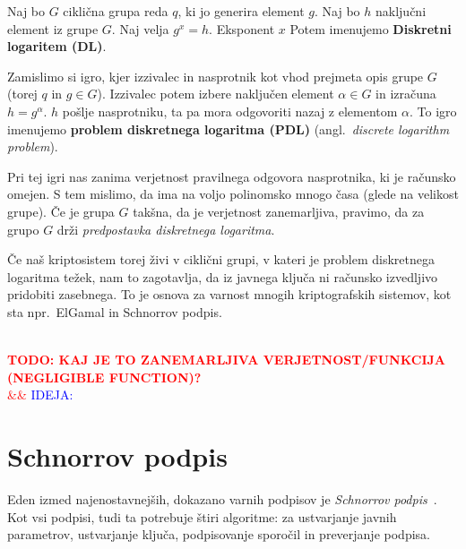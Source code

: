 \documentclass[isrm2, tisk]{fmfdelo}
\newcommand{\todo}[2][]{%
    \textcolor{red}{%
        \\ \textbf{\uppercase{todo: #2}}%
        \\%
        \ifx&#1&%
        \else%
            \textcolor{blue}{\uppercase{ideja:} #1}%
            \\%
        \fi%
    }%
}
\begin{document}
\begin{definicija}
\label{def:dl}
    Naj bo $G$ ciklična grupa reda $q$, ki jo generira element $g$. Naj bo $h$ naključni element iz 
    grupe $G$. Naj velja $g^x = h$. Eksponent $x$ Potem imenujemo \textbf{Diskretni logaritem (DL)}.

    Zamislimo si igro, kjer izzivalec in nasprotnik kot vhod prejmeta opis grupe $G$ (torej $q$ in 
    $g \in G$). Izzivalec potem izbere naključen element $\alpha \in G$ in izračuna $h = g^{\alpha}$.
    $h$ pošlje nasprotniku, ta pa mora odgovoriti nazaj z elementom $\alpha$. To igro imenujemo 
    \textbf{problem diskretnega logaritma (PDL)} (angl.\ \textit{discrete logarithm problem}).

    Pri tej igri nas zanima verjetnost pravilnega odgovora nasprotnika, ki je računsko omejen. S tem 
    mislimo, da ima na voljo polinomsko mnogo časa (glede na velikost grupe). Če je grupa $G$ takšna, 
    da je verjetnost zanemarljiva, pravimo, da za grupo $G$ drži \textit{predpostavka diskretnega 
    logaritma}.
\end{definicija}

Če naš kriptosistem torej živi v ciklični grupi, v kateri je problem diskretnega logaritma težek,
nam to zagotavlja, da iz javnega ključa ni računsko izvedljivo pridobiti zasebnega. To je osnova
za varnost mnogih kriptografskih sistemov, kot sta npr.\ ElGamal in Schnorrov podpis.

\todo{kaj je to zanemarljiva verjetnost/funkcija (negligible function)?}

\section{Schnorrov podpis}
\label{sec:schnorr}
Eden izmed najenostavnejših, dokazano varnih podpisov je \textit{Schnorrov podpis}~\cite{schnorr1989sig}.
Kot vsi podpisi, tudi ta potrebuje štiri algoritme: za ustvarjanje javnih parametrov, ustvarjanje ključa, 
podpisovanje sporočil in preverjanje podpisa.
\end{document}
